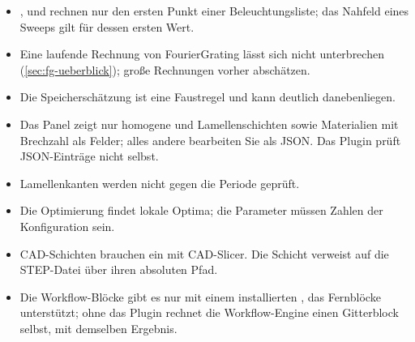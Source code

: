\begin{itemize}
  \item {},  und  rechnen nur den ersten Punkt einer
    Beleuchtungsliste; das Nahfeld eines Sweeps gilt für dessen ersten Wert.
  \item Eine laufende Rechnung von FourierGrating lässt sich nicht unterbrechen
    (\autoref{sec:fg-ueberblick}); große Rechnungen vorher abschätzen.
  \item Die Speicherschätzung ist eine Faustregel und kann deutlich danebenliegen.
  \item Das Panel zeigt nur homogene und Lamellenschichten sowie Materialien mit Brechzahl als
    Felder; alles andere bearbeiten Sie als JSON. Das Plugin prüft JSON-Einträge nicht selbst.
  \item Lamellenkanten werden nicht gegen die Periode geprüft.
  \item Die Optimierung findet lokale Optima; die Parameter müssen Zahlen der Konfiguration sein.
  \item CAD-Schichten brauchen ein  mit CAD-Slicer. Die Schicht verweist auf die
    STEP-Datei über ihren absoluten Pfad.
  \item Die Workflow-Blöcke gibt es nur mit einem installierten , das Fernblöcke
    unterstützt; ohne das Plugin rechnet die Workflow-Engine einen Gitterblock selbst, mit demselben
    Ergebnis.
\end{itemize}
